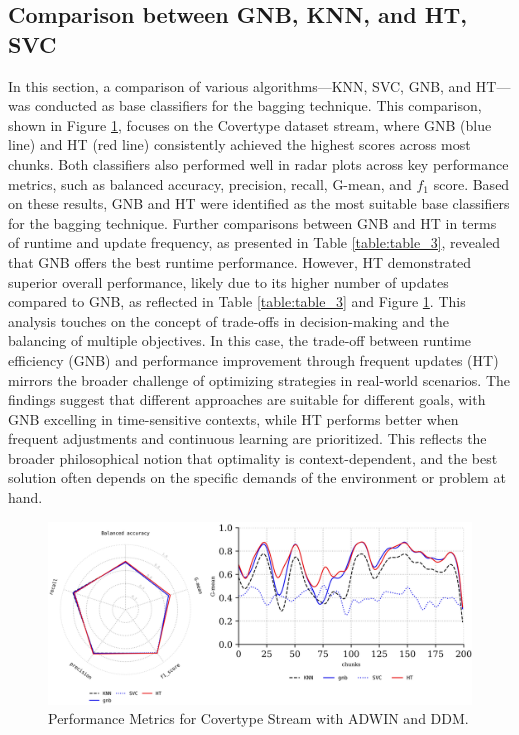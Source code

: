 \subsection{Comparison between GNB, KNN, and HT, SVC}
\label{sec:compared_base_calssfier}
In this section, a comparison of various algorithms—KNN, SVC, GNB, and HT—was conducted as base classifiers for the bagging technique. This comparison, shown in Figure \ref{fig:res4}, focuses on the Covertype dataset stream, where GNB (blue line) and HT (red line) consistently achieved the highest scores across most chunks. Both classifiers also performed well in radar plots across key performance metrics, such as balanced accuracy, precision, recall, G-mean, and $f_1$ score. Based on these results, GNB and HT were identified as the most suitable base classifiers for the bagging technique. Further comparisons between GNB and HT in terms of runtime and update frequency, as presented in Table \ref{table:table_3}, revealed that GNB offers the best runtime performance. However, HT demonstrated superior overall performance, likely due to its higher number of updates compared to GNB, as reflected in Table \ref{table:table_3} and Figure \ref{fig:res4}. This analysis touches on the concept of trade-offs in decision-making and the balancing of multiple objectives. In this case, the trade-off between runtime efficiency (GNB) and performance improvement through frequent updates (HT) mirrors the broader challenge of optimizing strategies in real-world scenarios. The findings suggest that different approaches are suitable for different goals, with GNB excelling in time-sensitive contexts, while HT performs better when frequent adjustments and continuous learning are prioritized. This reflects the broader philosophical notion that optimality is context-dependent, and the best solution often depends on the specific demands of the environment or problem at hand.

\begin{figure}[t]
	\centering
	\includegraphics[width=1\linewidth]{5_Emerging/images/res4.png}
	\caption{Performance Metrics for Covertype Stream with ADWIN and DDM.}

	\label{fig:res4}
\end{figure}				

